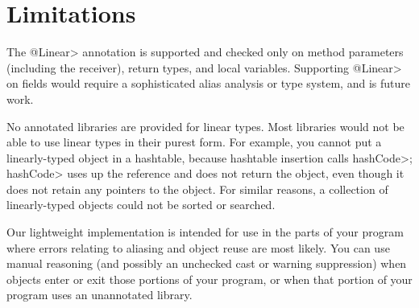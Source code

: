 \section{Limitations\label{linear-limitations}}

The \<@Linear> annotation is supported and checked only on method
parameters (including the receiver), return types, and local variables.
Supporting \<@Linear> on fields would require a sophisticated alias
analysis or type system, and is future work.

No annotated libraries are provided for linear types.  Most libraries would
not be able to use linear types in their purest form.  For example, you
cannot put a linearly-typed object in a hashtable, because hashtable
insertion calls \<hashCode>; \<hashCode> uses up the reference and does not
return the object, even though it does not retain any pointers to the
object.  For similar reasons, a collection of linearly-typed objects could
not be sorted or searched.

Our lightweight implementation is intended for use in the parts of your
program where errors relating to aliasing and object reuse are most likely.
You can use manual reasoning (and possibly an unchecked cast or warning
suppression) when objects enter or exit those portions of your program, or
when that portion of your program uses an unannotated library.


